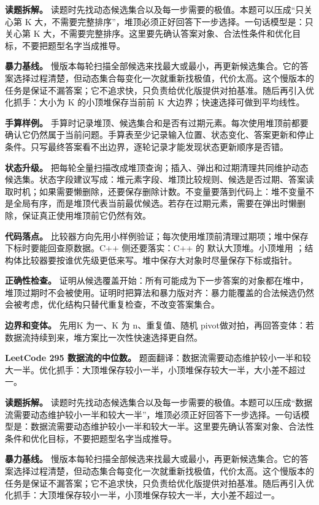 \textbf{读题拆解。} 读题时先找动态候选集合以及每一步需要的极值。本题可以压成“只关心第 K 大，不需要完整排序”，堆顶必须正好回答下一步选择。一句话模型是：只关心第 K 大，不需要完整排序。这里要先确认答案对象、合法性条件和优化目标，不要把题型名字当成推导。

\textbf{暴力基线。} 慢版本每轮扫描全部候选来找最大或最小，再更新候选集合。它的答案选择过程清楚，但动态集合每变化一次就重新找极值，代价太高。这个慢版本的任务是保证不漏答案；它不追求快，只负责给优化版提供对拍基准。随后再引入优化抓手：大小为 K 的小顶堆保存当前前 K 大边界；快速选择可做到平均线性。

\textbf{手算样例。} 手算时记录堆顶、候选集合和是否有过期元素。每次使用堆顶前都要确认它仍然属于当前问题。手算表至少记录输入位置、状态变化、答案更新和停止条件。只写最终答案看不出边界，逐轮记录才能发现状态更新顺序是否错。

\textbf{状态升级。} 把每轮全量扫描改成堆顶查询；插入、弹出和过期清理共同维护动态候选集。状态字段建议写成：堆元素字段、堆顶比较规则、候选是否过期、答案读取时机；如果需要懒删除，还要保存删除计数。不变量要落到代码上：堆不变量不是全局有序，而是堆顶代表当前最优候选。若存在过期元素，需要在弹出时懒删除，保证真正使用堆顶前它仍然有效。

\textbf{代码落点。} 比较器方向先用小样例验证；每次使用堆顶前清理过期项；堆中保存下标时要能回查原数据。C++ 侧还要落实：C++ 的  默认大顶堆。小顶堆用 ；结构体比较器要按谁优先级更低来写。堆中保存大对象时尽量保存下标或指针。

\textbf{正确性检查。} 证明从候选覆盖开始：所有可能成为下一步答案的对象都在堆中，堆顶过期时不会被使用。证明时把算法和暴力版对齐：暴力能覆盖的合法候选仍然会被考虑，优化结构只替代重复检查，不改变答案集合。

\textbf{边界和变体。} 先用K 为一、K 为 n、重复值、随机 pivot做对拍，再回答变体：若数据流持续到来，堆方案比一次性快速选择更自然。

\noindent\textbf{LeetCode 295 数据流的中位数。} 题面翻译：数据流需要动态维护较小一半和较大一半。优化抓手：大顶堆保存较小一半，小顶堆保存较大一半，大小差不超过一。

\textbf{读题拆解。} 读题时先找动态候选集合以及每一步需要的极值。本题可以压成“数据流需要动态维护较小一半和较大一半”，堆顶必须正好回答下一步选择。一句话模型是：数据流需要动态维护较小一半和较大一半。这里要先确认答案对象、合法性条件和优化目标，不要把题型名字当成推导。

\textbf{暴力基线。} 慢版本每轮扫描全部候选来找最大或最小，再更新候选集合。它的答案选择过程清楚，但动态集合每变化一次就重新找极值，代价太高。这个慢版本的任务是保证不漏答案；它不追求快，只负责给优化版提供对拍基准。随后再引入优化抓手：大顶堆保存较小一半，小顶堆保存较大一半，大小差不超过一。

